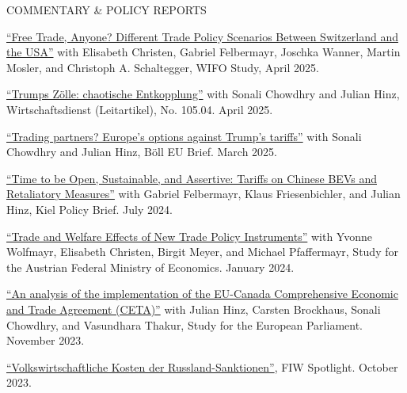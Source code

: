 \documentclass{article}
\begin{document}
\begin{minipage}[t]{0.12\textwidth}
    {\selectfont COMMENTARY \& POLICY REPORTS} \\
\end{minipage}
\hspace{5mm}
\begin{minipage}[t]{0.8\textwidth}
  \href{https://www.wifo.ac.at/publication/pid/57956826}{``Free Trade, Anyone?
Different Trade Policy Scenarios Between Switzerland and the USA''} with Elisabeth Christen, Gabriel Felbermayr, 
Joschka Wanner, Martin Mosler, and Christoph A. Schaltegger, WIFO Study, April 2025.\par
  \href{https://www.wirtschaftsdienst.eu/inhalt/jahr/2025/heft/4/beitrag/trumps-zoelle-chaotische-entkopplung.html}{``Trumps Zölle: chaotische Entkopplung''} with Sonali Chowdhry and Julian Hinz, Wirtschaftsdienst (Leitartikel), No. 105.04. April 2025.\par
    \href{https://eu.boell.org/sites/default/files/2025-03/2025_hbs_eu_policy_brief_trade_final.pdf}{``Trading partners? Europe's options against Trump's tariffs''} with Sonali Chowdhry and Julian Hinz, Böll EU Brief. March 2025.\par
    \href{https://www.ifw-kiel.de/publications/time-to-be-open-sustainable-and-assertive-tariffs-on-chinese-bevs-and-retaliatory-measures-33083/}{``Time to be Open, Sustainable, and Assertive: Tariffs on Chinese BEVs and Retaliatory Measures''} with Gabriel Felbermayr, Klaus Friesenbichler, and Julian Hinz, Kiel Policy Brief. July 2024.\par
    \href{https://www.fiw.ac.at/publications/trade-and-welfare-effects-of-new-trade-policy-instruments/}{``Trade and Welfare Effects of New Trade Policy Instruments''} with Yvonne Wolfmayr, Elisabeth Christen, Birgit Meyer, and Michael Pfaffermayr, Study for the Austrian Federal Ministry of Economics. January 2024.\par
    \href{https://www.europarl.europa.eu/RegData/etudes/IDAN/2023/754440/EXPO_IDA(2023)754440_EN.pdf}{``An analysis of the implementation of the EU-Canada Comprehensive Economic and Trade Agreement (CETA)''} with Julian Hinz, Carsten Brockhaus, Sonali Chowdhry, and Vasundhara Thakur, Study for the European Parliament. November 2023. \par
    \href{https://www.fiw.ac.at/2023/10/02/volkswirtschaftliche-kosten-der-russland-sanktionen/}{``Volkswirtschaftliche Kosten der Russland-Sanktionen''}, FIW Spotlight. October 2023. \par

\end{minipage}
\end{document}
